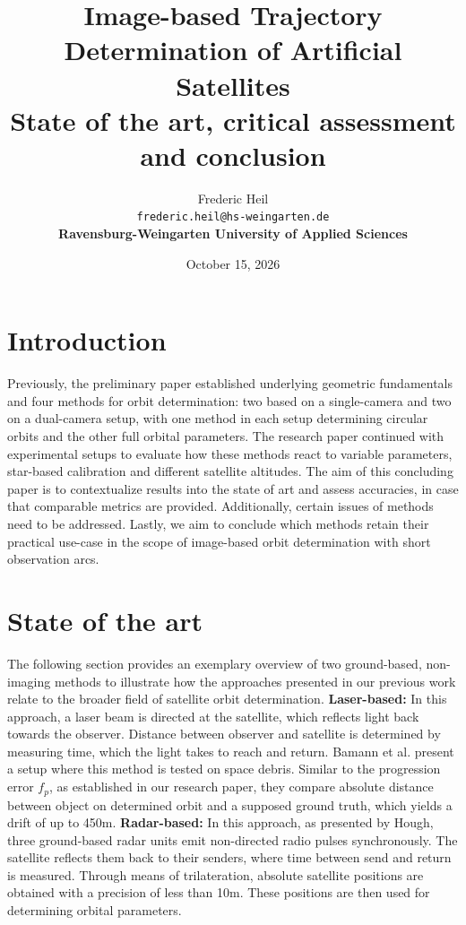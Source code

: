 \documentclass[11pt,a4paper]{article}
\title{Image-based Trajectory Determination of Artificial Satellites \\\large State of the art, critical assessment and conclusion}
\author{Frederic Heil\\
	\texttt{frederic.heil@hs-weingarten.de}\\
	\textbf{Ravensburg-Weingarten University of Applied Sciences}
}
\date{October 15, 2026}
\begin{document}
	\maketitle
	
	\section{Introduction}
	
	Previously, the preliminary paper established underlying geometric fundamentals and four methods for orbit determination: two based on a single-camera and two on a dual-camera setup, with one method in each setup determining circular orbits and the other full orbital parameters. The research paper continued with experimental setups to evaluate how these methods react to variable parameters, star-based calibration and different satellite altitudes. The aim of this concluding paper is to contextualize results into the state of art and assess accuracies, in case that comparable metrics are provided. Additionally, certain issues of methods need to be addressed. Lastly, we aim to conclude which methods retain their practical use-case in the scope of image-based orbit determination with short observation arcs.
	
	\section{State of the art}
	The following section provides an exemplary overview of two ground-based, non-imaging methods to illustrate how the approaches presented in our previous work \cite{orbit_determination_preliminary, orbit_determination_research} relate to the broader field of satellite orbit determination. \newline 
	\textbf{Laser-based:}\newline
	In this approach, a laser beam is directed at the satellite, which reflects light back towards the observer. Distance between observer and satellite is determined by measuring time, which the light takes to reach and return. Bamann et al. present a setup where this method is tested on space debris. Similar to the progression error $f_p$, as established in our research paper, they compare absolute distance between object on determined orbit and a supposed ground truth, which yields a drift of up to 450m. \cite{accurate_orbit_debris_laser}
	\newline
	\textbf{Radar-based:}\newline
	In this approach, as presented by Hough, three ground-based radar units emit non-directed radio pulses synchronously. The satellite reflects them back to their senders, where time between send and return is measured. Through means of trilateration, absolute satellite positions are obtained with a precision of less than 10m. These positions are then used for determining orbital parameters. \cite{precise_orbit_determination_radar}
\end{document}
